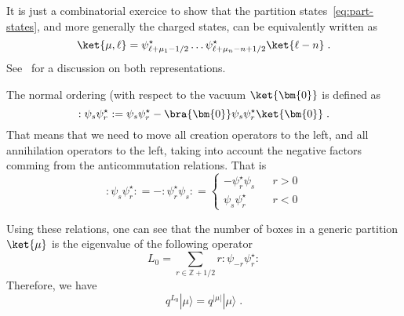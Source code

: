 It is just a combinatorial exercice to show that the partition
states~\ref{eq:part-states}, and more generally the charged states,
can be equivalently written as
\begin{equation}
  \label{eq:part-states:2}
  \ket{\mu, \ell} = \psi^\star_{\ell + \mu_1 - 1/2} \dots
  \psi^\star_{\ell + \mu_n - n + 1/2} \ket{\ell - n}\; .
\end{equation}
See~\cite{Alexandrov:2012tr} for a discussion on both representations.

The normal ordering (with respect to the vacuum \(\ket{\bm{0}}\) is
defined as
\begin{equation}
:\psi_s \psi_r^\star: = \psi_s \psi_r^\star - \bra{\bm{0}} \psi_s
  \psi_r^\star \ket{\bm{0}} \; .
\end{equation}
That means that we need to move all creation operators to the left, and all
annihilation operators to the left, taking into account the negative factors
comming from the anticommutation relations. That is
\begin{equation}
:\psi_s \psi_r^\star:   = - :\psi_r^\star \psi_s: = 
\left\{
\begin{array}{rll}
-\psi_r^\star \psi_s && r>0 \\
\psi_s \psi_r^\star && r<0 
\end{array}	
\right.
\end{equation}

Using these relations, one can see that the number of boxes in
a generic partition \(\ket{\mu}\) is the eigenvalue of the following
operator \cite{Marino:2005sj}
\begin{equation}
L_0 = \sum_{r \in \mathbb{Z} + 1/2} r :\psi_{-r} \psi_r^\star:
\end{equation}
Therefore, we have
\begin{equation}
q^{L_0}|\mu \rangle = q^{|\mu|}|\mu \rangle \; .
\end{equation}	

